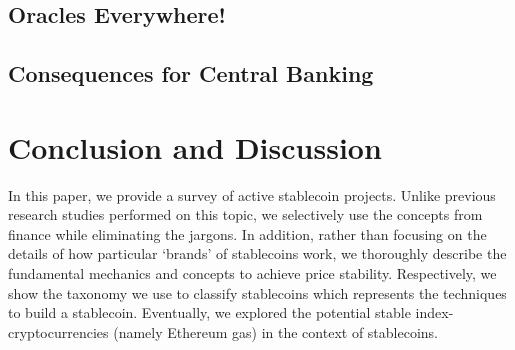 



\subsection{Oracles Everywhere!}

\subsection{Consequences for Central Banking}

\section{Conclusion and Discussion}

In this paper, we provide a survey of active stablecoin projects. Unlike previous research studies performed on this topic, we selectively use the concepts from finance while eliminating the jargons. In addition, rather than focusing on the details of how particular `brands' of stablecoins work, we thoroughly describe the fundamental mechanics and concepts to achieve price stability. Respectively, we show the taxonomy we use to classify stablecoins which represents the techniques to build a stablecoin. Eventually, we explored the potential stable index-cryptocurrencies (namely Ethereum gas) in the context of stablecoins.













